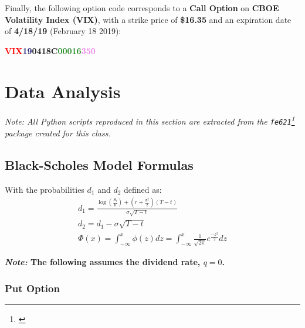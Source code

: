 \documentclass[10pt]{article}
\newcommand*\lstinputpath[1]{\lstset{inputpath=#1}} %
\begin{document}
        Finally, the following option code corresponds to a \textbf{Call Option} on \textbf{CBOE Volatility Index (VIX)}, with a strike price of \textbf{\$16.35} and an expiration date of \textbf{4/18/19} (February 18 2019):
    
        \begin{center}
            \textbf{\textcolor{red}{VIX}\textcolor{MidnightBlue}{19}\textcolor{Bittersweet}{04}\textcolor{YellowOrange}{18}\textcolor{RoyalPurple}{C}\textcolor{ForestGreen}{00016}\textcolor{violet}{350}}
        \end{center}



\newpage

\lstinputpath{..}

\section{Data Analysis}

    \begin{center}
        \textit{Note: All Python scripts reproduced in this section are extracted from the \texttt{fe621}\footnote{\cite{Weerawarana2019}} package created for this class.}
    \end{center}

    \subsection{Black-Scholes Model Formulas}

    With the probabilities $d_1$ and $d_2$ defined as:
    \begin{gather*}
        d_1 = \frac{\log \left( \frac{S_t}{K} \right) + \left( r + \frac{\sigma^2}{2} \right) (T-t)}{\sigma \sqrt{T-t}} \\
        d_2 = d_1 - \sigma \sqrt{T-t} \\
        \Phi(x) = \int_{-\infty}^{x} \phi(z) dz = \int_{-\infty}^{x} \frac{1}{\sqrt{2\pi}} e^{\frac{-z^2}{2}} dz
    \end{gather*}

    

    \begin{center}
        \textbf{\textit{Note:} The following assumes the dividend rate, $q = 0$.}
    \end{center}

        \subsubsection{Put Option}
\end{document}
